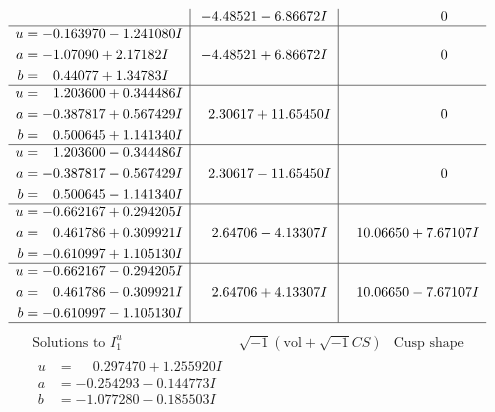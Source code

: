 \documentclass[1p]{elsarticle_modified}
\theoremstyle{definition}
\newcommand{\I}{\sqrt{-1}}
\begin{document}
$$\begin{array}{c|c|c}
 & -4.48521 - 6.86672 I & \phantom{-0.000000 } 0 \\ \hline\begin{aligned}
u &= -0.163970 - 1.241080 I \\
a &= -1.07090 + 2.17182 I \\
b &= \phantom{-}0.44077 + 1.34783 I\end{aligned}
 & -4.48521 + 6.86672 I & \phantom{-0.000000 } 0 \\ \hline\begin{aligned}
u &= \phantom{-}1.203600 + 0.344486 I \\
a &= -0.387817 + 0.567429 I \\
b &= \phantom{-}0.500645 + 1.141340 I\end{aligned}
 & \phantom{-}2.30617 + 11.65450 I & \phantom{-0.000000 } 0 \\ \hline\begin{aligned}
u &= \phantom{-}1.203600 - 0.344486 I \\
a &= -0.387817 - 0.567429 I \\
b &= \phantom{-}0.500645 - 1.141340 I\end{aligned}
 & \phantom{-}2.30617 - 11.65450 I & \phantom{-0.000000 } 0 \\ \hline\begin{aligned}
u &= -0.662167 + 0.294205 I \\
a &= \phantom{-}0.461786 + 0.309921 I \\
b &= -0.610997 + 1.105130 I\end{aligned}
 & \phantom{-}2.64706 - 4.13307 I & \phantom{-}10.06650 + 7.67107 I \\ \hline\begin{aligned}
u &= -0.662167 - 0.294205 I \\
a &= \phantom{-}0.461786 - 0.309921 I \\
b &= -0.610997 - 1.105130 I\end{aligned}
 & \phantom{-}2.64706 + 4.13307 I & \phantom{-}10.06650 - 7.67107 I\\
 \hline 
 \end{array}$$\newpage$$\begin{array}{c|c|c}  
\text{Solutions to }I^u_{1}& \I (\text{vol} + \sqrt{-1}CS) & \text{Cusp shape}\\
 \hline 
\begin{aligned}
u &= \phantom{-}0.297470 + 1.255920 I \\
a &= -0.254293 - 0.144773 I \\
b &= -1.077280 - 0.185503 I\end{aligned}

\end{array}$$
\end{document}
